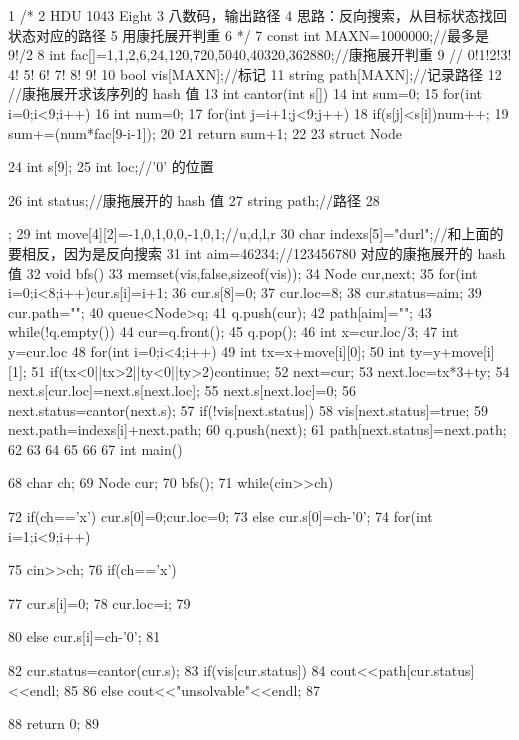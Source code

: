 \documentclass[11pt]{article}
\begin{document}
\begin{Code}
 1   /*
 2   HDU 1043 Eight
 3   八数码，输出路径
 4   思路：反向搜索，从目标状态找回状态对应的路径
 5   用康托展开判重
 6   */
 7   const int MAXN=1000000;//最多是 9!/2
 8   int fac[]={1,1,2,6,24,120,720,5040,40320,362880};//康拖展开判重
 9   //         0!1!2!3! 4! 5! 6! 7!     8!    9!
10   bool vis[MAXN];//标记
11   string path[MAXN];//记录路径
12   //康拖展开求该序列的 hash 值
13   int cantor(int s[]){
14       int sum=0;
15       for(int i=0;i<9;i++){
16           int num=0;
17           for(int j=i+1;j<9;j++)
18             if(s[j]<s[i])num++;
19           sum+=(num*fac[9-i-1]);
20       }
21       return sum+1;
22   }
23   struct Node{
24       int s[9];
25       int loc;//'0' 的位置


26       int status;//康拖展开的 hash 值
27       string path;//路径
28   };
29   int move[4][2]={{-1,0},{1,0},{0,-1},{0,1}};//u,d,l,r
30   char indexs[5]="durl";//和上面的要相反，因为是反向搜索
31   int aim=46234;//123456780 对应的康拖展开的 hash 值
32   void bfs(){
33       memset(vis,false,sizeof(vis));
34       Node cur,next;
35       for(int i=0;i<8;i++)cur.s[i]=i+1;
36       cur.s[8]=0;
37       cur.loc=8;
38       cur.status=aim;
39       cur.path="";
40       queue<Node>q;
41       q.push(cur);
42       path[aim]="";
43       while(!q.empty()){
44           cur=q.front();
45           q.pop();
46           int x=cur.loc/3;
47           int y=cur.loc%
48           for(int i=0;i<4;i++){
49               int tx=x+move[i][0];
50               int ty=y+move[i][1];
51               if(tx<0||tx>2||ty<0||ty>2)continue;
52               next=cur;
53               next.loc=tx*3+ty;
54               next.s[cur.loc]=next.s[next.loc];
55               next.s[next.loc]=0;
56               next.status=cantor(next.s);
57               if(!vis[next.status]){
58                    vis[next.status]=true;
59                    next.path=indexs[i]+next.path;
60                    q.push(next);
61                    path[next.status]=next.path;
62               }
63           }
64       }
65
66   }
67   int main(){
68       char ch;
69       Node cur;
70       bfs();
71       while(cin>>ch){
72           if(ch=='x') {cur.s[0]=0;cur.loc=0;}
73           else cur.s[0]=ch-'0';
74           for(int i=1;i<9;i++){
75                cin>>ch;
76                if(ch=='x'){


77                    cur.s[i]=0;
78                    cur.loc=i;
79                }
80                else cur.s[i]=ch-'0';
81            }
82            cur.status=cantor(cur.s);
83            if(vis[cur.status]){
84                cout<<path[cur.status]<<endl;
85            }
86            else cout<<"unsolvable"<<endl;
87     }
88     return 0;
89 }
\end{Code}
\end{document}
